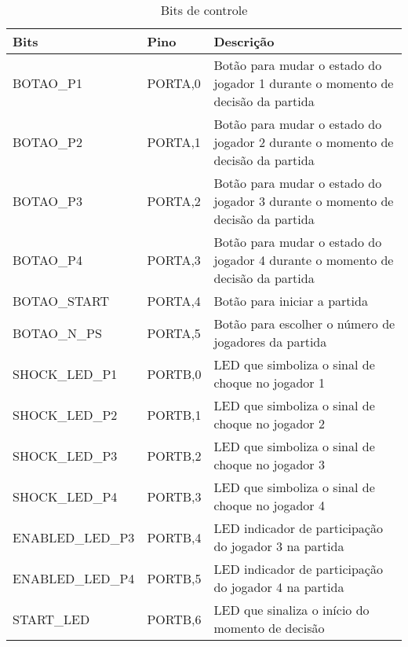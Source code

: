 \documentclass[a4paper,10pt]{article}
\begin{document}
\begin{table}
  \centering
  \caption{Bits de controle}
  \vspace{0.5cm}
  \label{tab:bits}
  \begin{tabular}{|p{3.4cm}|p{1.4cm}|p{6.2cm}|}\hline
    Bits 		& Pino		& Descrição						\\ \hline
    BOTAO\_P1		& PORTA,0	& Botão para mudar o estado do jogador 1 durante
					  o momento de decisão da partida			\\ \hline
    BOTAO\_P2		& PORTA,1	& Botão para mudar o estado do jogador 2 durante
					  o momento de decisão da partida			\\ \hline
    BOTAO\_P3		& PORTA,2	& Botão para mudar o estado do jogador 3 durante
					  o momento de decisão da partida			\\ \hline
    BOTAO\_P4		& PORTA,3	& Botão para mudar o estado do jogador 4 durante
					  o momento de decisão da partida			\\ \hline
    BOTAO\_START	& PORTA,4	& Botão para iniciar a partida				\\ \hline
    BOTAO\_N\_PS	& PORTA,5	& Botão para escolher o número de jogadores da partida	\\ \hline
    SHOCK\_LED\_P1	& PORTB,0	& LED que simboliza o sinal de choque no jogador 1	\\ \hline
    SHOCK\_LED\_P2	& PORTB,1	& LED que simboliza o sinal de choque no jogador 2	\\ \hline
    SHOCK\_LED\_P3	& PORTB,2	& LED que simboliza o sinal de choque no jogador 3	\\ \hline
    SHOCK\_LED\_P4	& PORTB,3	& LED que simboliza o sinal de choque no jogador 4	\\ \hline
    ENABLED\_LED\_P3	& PORTB,4	& LED indicador de participação do jogador 3 na partida	\\ \hline
    ENABLED\_LED\_P4	& PORTB,5	& LED indicador de participação do jogador 4 na partida	\\ \hline
    START\_LED		& PORTB,6	& LED que sinaliza o início do momento de decisão	\\ \hline
  \end{tabular}
\end{table}
\end{document}
